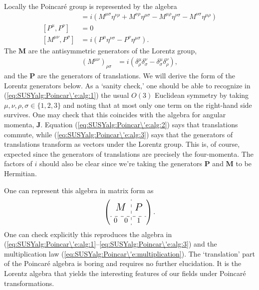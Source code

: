 Locally the Poincar\'e group is represented by the algebra
\begin{align}
    [M^{\mu\nu},M^{\rho\sigma}] &= i(M^{\mu\sigma}\eta^{\nu\rho}+ M^{\nu\rho}\eta^{\mu\sigma} - M^{\mu\rho}\eta^{\nu\sigma} - M^{\nu\sigma}\eta^{\mu\rho})\label{eq:SUSYalg:Poincar\'e:alg:1}\\
    [P^\mu,P^\nu] &= 0\label{eq:SUSYalg:Poincar\'e:alg:2}\\
    [M^{\mu\nu}, P^\sigma] &= i(P^\mu\eta^{\nu\sigma}-P^\nu\eta^{\mu\sigma}).\label{eq:SUSYalg:Poincar\'e:alg:3}
\end{align}
The $\mathbf{M}$ are the antisymmetric generators of the Lorentz group,
\begin{align}
(M^{\mu\nu})_{\rho\sigma}&=i(\delta^\mu_\rho\delta^\nu_\sigma-\delta^\mu_\sigma\delta^\nu_\rho),\label{eq:SUSYalg:LorentzGenerators}
\end{align}
and the $\mathbf P$ are the generators of translations. We will derive the form of the Lorentz generators below. As a `sanity check,' one should be able to recognize in  (\ref{eq:SUSYalg:Poincar\'e:alg:1}) the usual $O(3)$ Euclidean symmetry  by taking $\mu,\nu,\rho,\sigma \in \{1,2,3\}$ and noting that at most only one term on the right-hand side survives. One may check that this coincides with the algebra for angular momenta, $\mathbf J$.  Equation (\ref{eq:SUSYalg:Poincar\'e:alg:2}) says that translations commute, while  (\ref{eq:SUSYalg:Poincar\'e:alg:3}) says that the generators of translations transform as vectors under the Lorentz group. This is, of course, expected since the generators of translations are precisely the four-momenta. The factors of $i$ should also be clear since we're taking the generators $\mathbf{P}$ and $\mathbf{M}$ to be Hermitian. 

One can represent this algebra in matrix form as
\begin{align}
    \left(
    \begin{array}{cc:c}
    \multicolumn{2}{c:}{\multirow{2}{*}{\Large{$M$}}} & \multicolumn{1}{c}{\multirow{2}{*}{\Large{$P$}}} \\
     &&  \\
    \hdashline
    0 & 0 & 1
    \end{array}
    \right).
\end{align}
One can check explicitly this reproduces the algebra in (\ref{eq:SUSYalg:Poincar\'e:alg:1}--\ref{eq:SUSYalg:Poincar\'e:alg:3}) and the multiplication law (\ref{eq:SUSYalg:Poincar\'e:multiplication}).
%
The `translation' part of the Poincar\'e algebra is boring and requires no further elucidation. It is the Lorentz algebra that yields the interesting features of our fields under Poincar\'e transformations.

